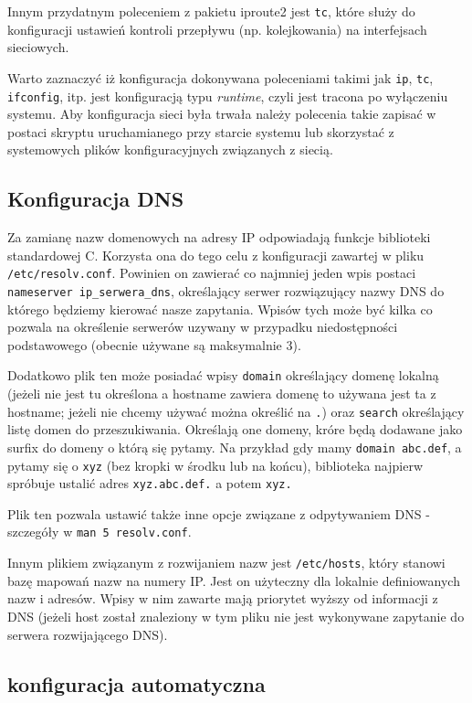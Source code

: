 Innym przydatnym poleceniem z pakietu iproute2 jest \Verb#tc#, które służy do konfiguracji ustawień kontroli przepływu (np. kolejkowania) na interfejsach sieciowych.

Warto zaznaczyć iż konfiguracja dokonywana poleceniami takimi jak \Verb#ip#, \Verb#tc#, \Verb#ifconfig#, itp. jest konfiguracją typu \textit{runtime}, czyli jest tracona po wyłączeniu systemu.
Aby konfiguracja sieci była trwała należy polecenia takie zapisać w postaci skryptu uruchamianego przy starcie systemu lub skorzystać z systemowych plików konfiguracyjnych związanych z siecią.


\subsection{Konfiguracja DNS}

Za zamianę nazw domenowych na adresy IP odpowiadają funkcje biblioteki standardowej C. Korzysta ona do tego celu z konfiguracji zawartej w pliku \Verb#/etc/resolv.conf#.
Powinien on zawierać co najmniej jeden wpis postaci \Verb#nameserver ip_serwera_dns#, określający serwer rozwiązujący nazwy DNS do którego będziemy kierować nasze zapytania.
Wpisów tych może być kilka co pozwala na określenie serwerów uzywany w przypadku niedostępności podstawowego (obecnie używane są maksymalnie 3).

Dodatkowo plik ten może posiadać wpisy
	\Verb#domain# określający domenę lokalną (jeżeli nie jest tu określona a hostname zawiera domenę to używana jest ta z hostname; jeżeli nie chcemy używać można określić na \Verb#.#) oraz
	\Verb#search# określający listę domen do przeszukiwania.
Określają one domeny, króre będą dodawane jako surfix do domeny o którą się pytamy. Na przykład gdy mamy \Verb#domain abc.def#, a pytamy się o \Verb#xyz# (bez kropki w środku lub na końcu), biblioteka najpierw spróbuje ustalić adres \Verb#xyz.abc.def.# a potem \Verb#xyz.#

Plik ten pozwala ustawić także inne opcje związane z odpytywaniem DNS - szczegóły w \Verb#man 5 resolv.conf#.

Innym plikiem związanym z rozwijaniem nazw jest \Verb#/etc/hosts#, który stanowi bazę mapowań nazw na numery IP.
Jest on użyteczny dla lokalnie definiowanych nazw i adresów.
Wpisy w nim zawarte mają priorytet wyższy od informacji z DNS (jeżeli host został znaleziony w tym pliku nie jest wykonywane zapytanie do serwera rozwijającego DNS).


\subsection{konfiguracja automatyczna}

